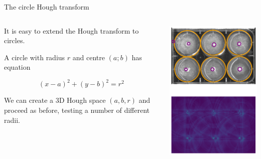 \documentclass[9pt, aspectratio=169]{beamer}
\begin{document}
\begin{frame}
    {The circle Hough transform}
    \begin{columns}
        \begin{column}{.6\textwidth}
            It is easy to extend the Hough transform to circles.

            A circle with radius $r$ and centre $(a; b)$ has equation

            $$(x - a)^2 + (y - b)^2 = r^2$$

            \pause
            We can create a 3D Hough space $(a, b, r)$ and proceed as before, testing a number of different radii.

        \end{column}
        \begin{column}{.4\textwidth}
            {\includegraphics[width=.9\textwidth]{hough_circle.png}}
        \end{column}
    \end{columns}
\end{frame}
\end{document}
